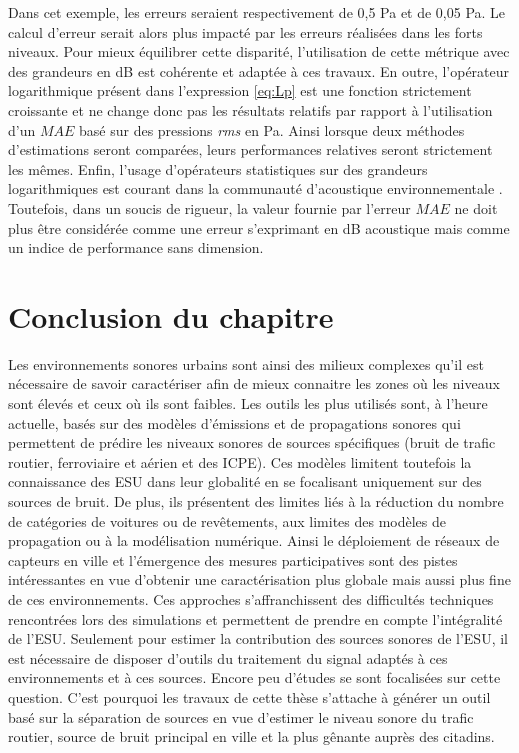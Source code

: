 Dans cet exemple, les erreurs seraient respectivement de 0,5 Pa et de 0,05 Pa. Le calcul d'erreur serait alors plus impacté par les erreurs réalisées dans les forts niveaux. Pour mieux équilibrer cette disparité, l'utilisation de cette métrique avec des grandeurs en dB est cohérente et adaptée à ces travaux. 
En outre, l'opérateur logarithmique présent dans l'expression \ref{eq:Lp} est une fonction strictement croissante et ne change donc pas les résultats relatifs par rapport à l'utilisation d'un $MAE$ basé sur des pressions \textit{rms} en Pa. Ainsi lorsque deux méthodes d'estimations seront comparées, leurs performances relatives seront strictement les mêmes.
Enfin, l'usage d'opérateurs statistiques sur des grandeurs logarithmiques est courant dans la communauté d'acoustique environnementale \cite{aumond2018kriging,morillas2014uncertainty}.
Toutefois, dans un soucis de rigueur, la valeur fournie par l'erreur $MAE$ ne doit plus être considérée comme une erreur s'exprimant en dB acoustique mais comme un indice de performance sans dimension.\\

\section{Conclusion du chapitre}
Les environnements sonores urbains sont ainsi des milieux complexes qu'il est nécessaire de savoir caractériser afin de mieux connaitre les zones où les niveaux sont élevés et ceux où ils sont faibles. 
Les outils les plus utilisés sont, à l'heure actuelle, basés sur des modèles d'émissions et de propagations sonores qui permettent de prédire les niveaux sonores de sources spécifiques (bruit de trafic routier, ferroviaire et aérien et des ICPE). Ces modèles limitent toutefois la connaissance des ESU dans leur globalité en se focalisant uniquement sur des sources de bruit. De plus, ils présentent des limites liés à la réduction du nombre de catégories de voitures ou de revêtements, aux limites des modèles de propagation ou à la modélisation numérique.  
Ainsi le déploiement de réseaux de capteurs en ville et l'émergence des mesures participatives sont des pistes intéressantes en vue d'obtenir une caractérisation plus globale mais aussi plus fine de ces environnements. Ces approches s'affranchissent des difficultés techniques rencontrées lors des simulations et permettent de prendre en compte l'intégralité de l'ESU. Seulement pour estimer la contribution des sources sonores de l'ESU, il est nécessaire de disposer d'outils du traitement du signal adaptés à ces environnements et à ces sources. 
Encore peu d'études se sont focalisées sur cette question. C'est pourquoi les travaux de cette thèse s'attache à générer un outil basé sur la séparation de sources en vue d'estimer le niveau sonore du trafic routier, source de bruit principal en ville et la plus gênante auprès des citadins.\\

